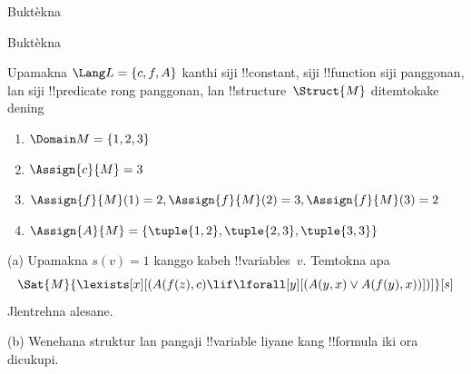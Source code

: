 \documentclass[../../../include/open-logic-section]{subfiles}
\begin{document}

\begin{prob}
  Buktèkna 
\end{prob}
\tagendprob


\begin{prob}
  Buktèkna 
\end{prob}
\tagendprob

\begin{prob}
Upamakna $\Lang L = \{c, f, A\}$ kanthi siji !!{constant}, siji
!!{function} siji panggonan, lan siji !!{predicate} rong panggonan,
lan !!{structure}~$\Struct{M}$ ditemtokake dening
\begin{enumerate}
\item $\Domain M = \{1, 2, 3\}$
\item $\Assign{c}{M} = 3$
\item $\Assign{f}{M}(1) = 2, \Assign{f}{M}(2) = 3, \Assign{f}{M}(3) = 2$
\item $\Assign{A}{M} = \{\tuple{1, 2}, \tuple{2, 3}, \tuple{3, 3}\}$
\end{enumerate}
(a) Upamakna $s(v) = 1$ kanggo kabeh !!{variable}s~$v$.
Temtokna apa
\[
\Sat{M}{\lexists[x][(A(f(z), c) \lif \lforall[y][(A(y, x) \lor A(f(y),
      x))])]}[s]
\]
Jlentrehna alesane.

(b) Wenehana struktur lan pangaji !!{variable} liyane kang
!!{formula} iki ora dicukupi.
\end{prob}
\end{document}

